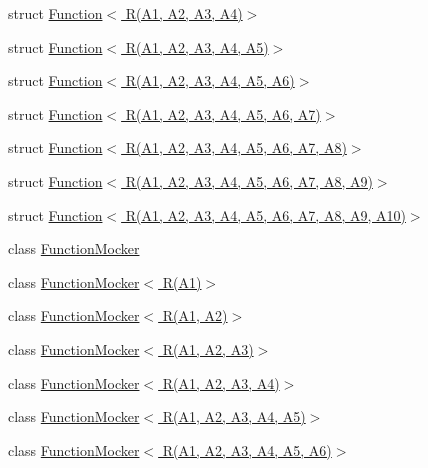 \begin{DoxyCompactItemize}
struct \hyperlink{structtesting_1_1internal_1_1Function_3_01R_07A1_00_01A2_00_01A3_00_01A4_08_4}{Function$<$ R(\+A1, A2, A3, A4)$>$}
\item 
struct \hyperlink{structtesting_1_1internal_1_1Function_3_01R_07A1_00_01A2_00_01A3_00_01A4_00_01A5_08_4}{Function$<$ R(\+A1, A2, A3, A4, A5)$>$}
\item 
struct \hyperlink{structtesting_1_1internal_1_1Function_3_01R_07A1_00_01A2_00_01A3_00_01A4_00_01A5_00_01A6_08_4}{Function$<$ R(\+A1, A2, A3, A4, A5, A6)$>$}
\item 
struct \hyperlink{structtesting_1_1internal_1_1Function_3_01R_07A1_00_01A2_00_01A3_00_01A4_00_01A5_00_01A6_00_01A7_08_4}{Function$<$ R(\+A1, A2, A3, A4, A5, A6, A7)$>$}
\item 
struct \hyperlink{structtesting_1_1internal_1_1Function_3_01R_07A1_00_01A2_00_01A3_00_01A4_00_01A5_00_01A6_00_01A7_00_01A8_08_4}{Function$<$ R(\+A1, A2, A3, A4, A5, A6, A7, A8)$>$}
\item 
struct \hyperlink{structtesting_1_1internal_1_1Function_3_01R_07A1_00_01A2_00_01A3_00_01A4_00_01A5_00_01A6_00_01A7_00_01A8_00_01A9_08_4}{Function$<$ R(\+A1, A2, A3, A4, A5, A6, A7, A8, A9)$>$}
\item 
struct \hyperlink{structtesting_1_1internal_1_1Function_3_01R_07A1_00_01A2_00_01A3_00_01A4_00_01A5_00_01A6_00_01A7_00_01A8_00_01A9_00_01A10_08_4}{Function$<$ R(\+A1, A2, A3, A4, A5, A6, A7, A8, A9, A10)$>$}
\item 
class \hyperlink{classtesting_1_1internal_1_1FunctionMocker}{Function\+Mocker}
\item 
class \hyperlink{classtesting_1_1internal_1_1FunctionMocker_3_01R_07A1_08_4}{Function\+Mocker$<$ R(\+A1)$>$}
\item 
class \hyperlink{classtesting_1_1internal_1_1FunctionMocker_3_01R_07A1_00_01A2_08_4}{Function\+Mocker$<$ R(\+A1, A2)$>$}
\item 
class \hyperlink{classtesting_1_1internal_1_1FunctionMocker_3_01R_07A1_00_01A2_00_01A3_08_4}{Function\+Mocker$<$ R(\+A1, A2, A3)$>$}
\item 
class \hyperlink{classtesting_1_1internal_1_1FunctionMocker_3_01R_07A1_00_01A2_00_01A3_00_01A4_08_4}{Function\+Mocker$<$ R(\+A1, A2, A3, A4)$>$}
\item 
class \hyperlink{classtesting_1_1internal_1_1FunctionMocker_3_01R_07A1_00_01A2_00_01A3_00_01A4_00_01A5_08_4}{Function\+Mocker$<$ R(\+A1, A2, A3, A4, A5)$>$}
\item 
class \hyperlink{classtesting_1_1internal_1_1FunctionMocker_3_01R_07A1_00_01A2_00_01A3_00_01A4_00_01A5_00_01A6_08_4}{Function\+Mocker$<$ R(\+A1, A2, A3, A4, A5, A6)$>$}

\end{DoxyCompactItemize}

